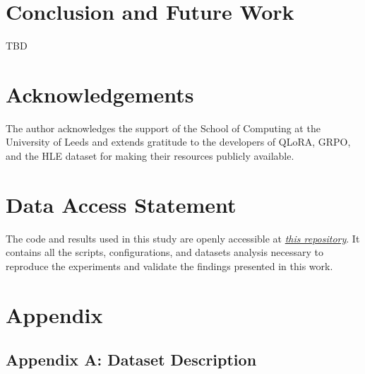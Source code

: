 \documentclass{svproc}
\begin{document}


\section{Conclusion and Future Work}
TBD



\section{Acknowledgements}
The author acknowledges the support of the School of Computing at the University of Leeds and extends gratitude to the developers of QLoRA, GRPO, and the HLE dataset for making their resources publicly available.




\section{Data Access Statement}
The code and results used in this study are openly accessible at {\it \href{https://github.com/pre63/grpo-fine-tuning-LLaMA-study}{this repository}}. It contains all the scripts, configurations, and datasets analysis necessary to reproduce the experiments and validate the findings presented in this work.




\printbibliography



\section{Appendix}

\subsection{Appendix A: Dataset Description}

\begin{center}
   
\end{center}

\begin{center}
   
\end{center}

\begin{center}
   
\end{center}
\end{document}
